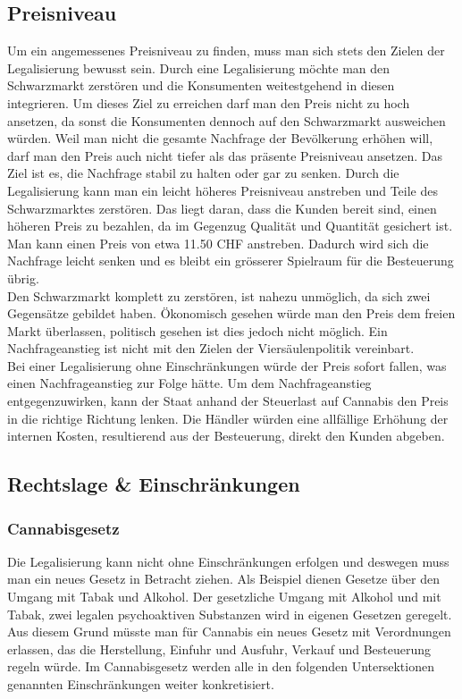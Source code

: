 \documentclass[../main.tex]{subfiles}
\begin{document}
	 
	 \subsection{Preisniveau}
	 
	 Um ein angemessenes Preisniveau zu finden, muss man sich stets den Zielen der Legalisierung bewusst sein. 
	 Durch eine Legalisierung möchte man den Schwarzmarkt zerstören und die Konsumenten weitestgehend in diesen integrieren. 
	 Um dieses Ziel zu erreichen darf man den Preis nicht zu hoch ansetzen, da sonst die Konsumenten dennoch auf den Schwarzmarkt ausweichen würden.
	 Weil man nicht die gesamte Nachfrage der Bevölkerung erhöhen will, darf man den Preis auch nicht tiefer als das präsente Preisniveau ansetzen.
	 Das Ziel ist es, die Nachfrage stabil zu halten oder gar zu senken.
	 Durch die Legalisierung kann man ein leicht höheres Preisniveau anstreben und Teile des Schwarzmarktes zerstören. 
	 Das liegt daran, dass die Kunden bereit sind, einen höheren Preis zu bezahlen, da im Gegenzug Qualität und Quantität gesichert ist. 
	 Man kann einen Preis von etwa 11.50 CHF anstreben. 
	 Dadurch wird sich die Nachfrage leicht senken und es bleibt ein grösserer Spielraum für die Besteuerung übrig.\\
	 
	 \noindent
	 Den Schwarzmarkt komplett zu zerstören, ist nahezu unmöglich, da sich zwei Gegensätze gebildet haben.
	 Ökonomisch gesehen würde man den Preis dem freien Markt überlassen, politisch gesehen ist dies jedoch nicht möglich.
	 Ein Nachfrageanstieg ist nicht mit den Zielen der Viersäulenpolitik vereinbart.\\
	 
	 \noindent	
	 Bei einer Legalisierung ohne Einschränkungen würde der Preis sofort fallen, was einen Nachfrageanstieg zur Folge hätte.
	 Um dem Nachfrageanstieg entgegenzuwirken, kann der Staat anhand der Steuerlast auf Cannabis den Preis in die richtige Richtung lenken.
	 Die Händler würden eine allfällige Erhöhung der internen Kosten, resultierend aus der Besteuerung, direkt den Kunden abgeben.
	
	 
	 \subsection{Rechtslage \& Einschränkungen}
	 
	 \subsubsection{Cannabisgesetz}
	 Die Legalisierung kann nicht ohne Einschränkungen erfolgen und deswegen muss man ein neues Gesetz in Betracht ziehen.
	 Als Beispiel dienen Gesetze über den Umgang mit Tabak und Alkohol.
	 Der gesetzliche Umgang mit Alkohol und mit Tabak, zwei legalen psychoaktiven Substanzen wird in eigenen Gesetzen geregelt. 
	 Aus diesem Grund müsste man für Cannabis ein neues Gesetz mit Verordnungen erlassen, das die Herstellung, Einfuhr und Ausfuhr, Verkauf und Besteuerung regeln würde.	 
	 Im Cannabisgesetz werden alle in den folgenden Untersektionen genannten Einschränkungen weiter konkretisiert.
	 
\end{document}
